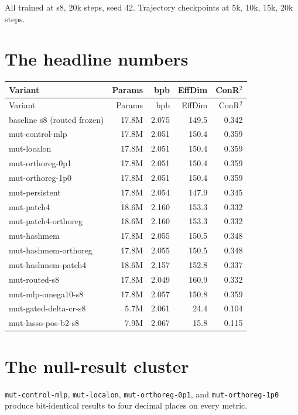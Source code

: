 \documentclass[11pt,openany]{book}
\begin{document}
All trained at s8, 20k steps, seed 42. Trajectory checkpoints at 5k,
10k, 15k, 20k steps.

\section{The headline numbers}

\begin{longtable}{lrrrr}
\toprule
Variant & Params & bpb & EffDim & ConR$^2$ \\
\midrule
\endfirsthead
\toprule
Variant & Params & bpb & EffDim & ConR$^2$ \\
\midrule
\endhead
baseline s8 (routed frozen) & 17.8M & 2.075 & 149.5 & 0.342 \\
mut-control-mlp & 17.8M & 2.051 & 150.4 & 0.359 \\
mut-localon & 17.8M & 2.051 & 150.4 & 0.359 \\
mut-orthoreg-0p1 & 17.8M & 2.051 & 150.4 & 0.359 \\
mut-orthoreg-1p0 & 17.8M & 2.051 & 150.4 & 0.359 \\
mut-persistent & 17.8M & 2.054 & 147.9 & 0.345 \\
mut-patch4 & 18.6M & 2.160 & 153.3 & 0.332 \\
mut-patch4-orthoreg & 18.6M & 2.160 & 153.3 & 0.332 \\
mut-hashmem & 17.8M & 2.055 & 150.5 & 0.348 \\
mut-hashmem-orthoreg & 17.8M & 2.055 & 150.5 & 0.348 \\
mut-hashmem-patch4 & 18.6M & 2.157 & 152.8 & 0.337 \\
mut-routed-s8 & 17.8M & 2.049 & 160.9 & 0.332 \\
mut-mlp-omega10-s8 & 17.8M & 2.057 & 150.8 & 0.359 \\
mut-gated-delta-cr-s8 & 5.7M & 2.061 & 24.4 & 0.104 \\
mut-lasso-pos-b2-s8 & 7.9M & 2.067 & 15.8 & 0.115 \\
\bottomrule
\end{longtable}

\section{The null-result cluster}

\texttt{mut-control-mlp}, \texttt{mut-localon},
\texttt{mut-orthoreg-0p1}, and \texttt{mut-orthoreg-1p0} produce
bit-identical results to four decimal places on every metric.
\end{document}
